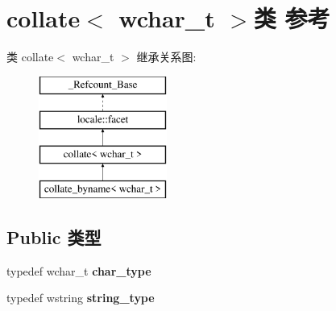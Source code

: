 \hypertarget{classcollate_3_01wchar__t_01_4}{}\section{collate$<$ wchar\+\_\+t $>$类 参考}
\label{classcollate_3_01wchar__t_01_4}
类 collate$<$ wchar\+\_\+t $>$ 继承关系图\+:\begin{figure}[H]
\begin{center}
\leavevmode
\includegraphics[height=4.000000cm]{classcollate_3_01wchar__t_01_4}
\end{center}
\end{figure}
\subsection*{Public 类型}
\begin{DoxyCompactItemize}
\item 
\mbox{\label{classcollate_3_01wchar__t_01_4_a2e7000a2738a25f935593ea4505ec929}} 
typedef wchar\+\_\+t {\bfseries char\+\_\+type}
\item 
\mbox{\label{classcollate_3_01wchar__t_01_4_a32094d29e001202c4fb580ef224532dc}} 
typedef wstring {\bfseries string\+\_\+type}
\end{DoxyCompactItemize}
